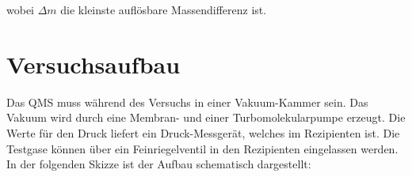 wobei $\Delta m$ die kleinste auflösbare Massendifferenz ist.

\section{Versuchsaufbau}
Das QMS muss während des Versuchs in einer Vakuum-Kammer sein. Das Vakuum wird durch eine Membran- und einer Turbomolekularpumpe erzeugt. Die Werte für den Druck liefert ein Druck-Messgerät, welches im Rezipienten ist. Die Testgase können über ein Feinriegelventil in den Rezipienten eingelassen werden. In der folgenden Skizze ist der Aufbau schematisch dargestellt:

